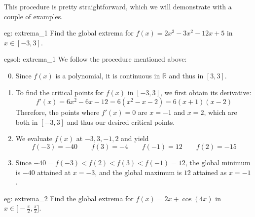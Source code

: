 This procedure is pretty straightforward, which we will demonstrate with a couple of examples. 

\begin{eg}[]{eg: extrema_1}
    Find the global extrema for $f(x) = 2x^3 - 3x^2 - 12x + 5$ in $x \in [-3, 3]$.
\end{eg}

\begin{egsol}[]{egsol: extrema_1}
    We follow the procedure mentioned above:
    \begin{enumerate}
        \setcounter{enumi}{-1}
        \item Since $f(x)$ is a polynomial, it is continuous in $\mathbb{R}$ and thus in $[3, 3]$.
        \item To find the critical points for $f(x)$ in $[-3, 3]$, we first obtain its derivative:
        \[f'(x) = 6x^2-6x-12 = 6(x^2-x-2) = 6(x+1)(x-2)\]
        Therefore, the points where $f'(x) = 0$ are $x = -1$ and $x = 2$, which are both in $[-3, 3]$ and thus our desired critical points.
        \item We evaluate $f(x)$ at $-3, 3, -1, 2$ and yield
        \[f(-3) = -40 \qquad f(3) = -4 \qquad f(-1) = 12 \qquad f(2) = -15\]
        \item Since $-40 = f(-3) < f(2) < f(3) < f(-1) = 12$, the global minimum is $-40$ attained at $x=-3$, and the global maximum is $12$ attained as $x = -1$.
    \end{enumerate}
\end{egsol}

\begin{eg}[]{eg: extrema_2}
    Find the global extrema for $f(x) = 2x + \cos(4x)$ in $x \in \big[-\frac{\pi}{2}, \frac{\pi}{2}\big]$.
\end{eg}

